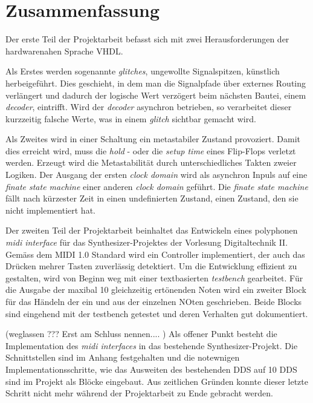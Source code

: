 
\chapter*{Zusammenfassung}

Der erste Teil der Projektarbeit befasst sich mit zwei Herausforderungen der hardwarenahen Sprache VHDL. 

Als Erstes werden sogenannte \textit{glitches}, ungewollte Signalspitzen, künstlich herbeigeführt. Dies geschieht, in dem man die Signalpfade über externes Routing verlängert und dadurch der logische Wert verzögert beim nächsten Bautei, einem \textit{decoder}, eintrifft. Wird der \textit{decoder} asynchron betrieben, so verarbeitet dieser kurzzeitig falsche Werte, was in einem \textit{glitch} sichtbar gemacht wird. 

Als Zweites wird in einer Schaltung ein metastabiler Zustand provoziert. Damit dies erreicht wird, muss die \textit{hold} - oder die\textit{ setup time} eines Flip-Flops verletzt werden. Erzeugt wird die Metastabilität durch unterschiedliches Takten zweier Logiken. Der Ausgang der ersten \textit{clock domain} wird als asynchron Inpuls auf eine \textit{finate state machine} einer anderen \textit{clock domain} geführt. Die \textit{finate state machine} fällt nach kürzester Zeit in einen undefinierten Zustand, einen Zustand, den sie nicht implementiert hat.



Der zweiten Teil der Projektarbeit beinhaltet das Entwickeln eines polyphonen \textit{midi interface} für das Synthesizer-Projektes der Vorlesung Digitaltechnik II. Gemäss dem MIDI 1.0 Standard wird ein Controller implementiert, der auch das Drücken mehrer Tasten zuverlässig detektiert. Um die Entwicklung effizient zu gestalten, wird von Beginn weg mit einer textbasierten \textit{testbench} gearbeitet. 
Für die Ausgabe der maxibal 10 gleichzeitig ertönenden Noten wird ein zweiter Block für das Händeln der ein und aus der einzelnen NOten geschrieben. Beide Blocks sind eingehend mit der testbench getestet und deren Verhalten gut dokumentiert.

(weglassen ??? Erst am Schluss nennen.... )
Als offener Punkt besteht die Implementation des \textit{midi interfaces} in das bestehende Synthesizer-Projekt. Die Schnittstellen sind im Anhang festgehalten und die notewnigen Implementationsschritte, wie das Ausweiten des bestehenden DDS auf 10 DDS sind im Projekt als Blöcke eingebaut. Aus zeitlichen Gründen konnte dieser letzte Schritt nicht mehr während der Projektarbeit zu Ende gebracht werden. 


